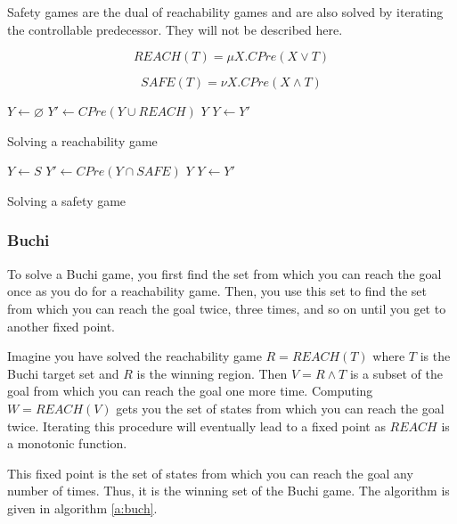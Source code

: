 \documentclass{book}
\theoremstyle{definition}
\begin{document}
Safety games are the dual of reachability games and are also solved by iterating the controllable predecessor. They will not be described here.

\begin{equation}
REACH(T) = \mu X. CPre(X \vee T)
\label{equ:mu_reach}
\end{equation}

\begin{equation}
SAFE(T) = \nu X. CPre(X \wedge T)
\label{equ:mu_safe}
\end{equation}

\begin{algorithm}[t]
\begin{algorithmic}
\State $Y \gets \varnothing$
\Loop
\State $Y' \gets CPre(Y \cup REACH)$
\State\Return $Y$\EndIf
\State $Y \gets Y'$
\EndLoop
\EndFunction
\end{algorithmic}
\caption{Solving a reachability game}
\label{a:reach}
\end{algorithm}

\begin{algorithm}[t]
\begin{algorithmic}
\State $Y \gets S$
\Loop
\State $Y' \gets CPre(Y \cap SAFE)$
\State\Return $Y$\EndIf
\State $Y \gets Y'$
\EndLoop
\EndFunction
\end{algorithmic}
\caption{Solving a safety game}
\label{a:safe}
\end{algorithm}

\subsubsection{Buchi}

To solve a Buchi game, you first find the set from which you can reach the goal once as you do for a reachability game. Then, you use this set to find the set from which you can reach the goal twice, three times, and so on until you get to another fixed point. 

Imagine you have solved the reachability game $R = REACH(T)$ where $T$ is the Buchi target set and $R$ is the winning region. Then $V = R \wedge T$ is a subset of the goal from which you can reach the goal one more time. Computing $W = REACH(V)$ gets you the set of states from which you can reach the goal twice. Iterating this procedure will eventually lead to a fixed point as $REACH$ is a monotonic function.

This fixed point is the set of states from which you can reach the goal any number of times. Thus, it is the winning set of the Buchi game. The algorithm is given in algorithm \ref{a:buch}.
\end{document}
